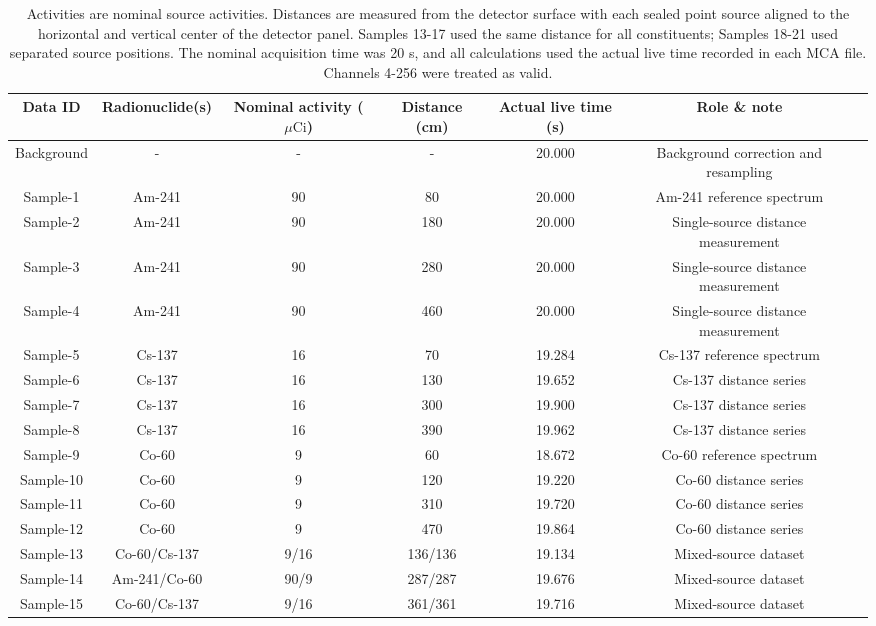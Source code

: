\documentclass[pdflatex,sn-mathphys-num, table]{sn-jnl}%
\theoremstyle{thmstyleone}%
\theoremstyle{thmstyletwo}%
\theoremstyle{thmstylethree}%
\begin{document}
\begin{table}
\centering
\caption{Activities are nominal source activities. Distances are measured from the detector surface with each sealed point source aligned to the horizontal and vertical center of the detector panel. Samples 13-17 used the same distance for all constituents; Samples 18-21 used separated source positions. The nominal acquisition time was 20 s, and all calculations used the actual live time recorded in each MCA file. Channels 4-256 were treated as valid.}
\label{tab:isotope_lists}
\begin{tabular}{ccccccc}
\toprule
Data ID & Radionuclide(s) & Nominal activity  ($\mu\text{Ci}$) & Distance (cm) & Actual live time (s) & Role \& note \\
\midrule
Background  & - &- &- & 20.000 & Background correction and resampling \\
Sample-1    & Am-241 & 90 & 80 & 20.000 & Am-241  reference spectrum \\
Sample-2    & Am-241 & 90 & 180 & 20.000 & Single-source distance measurement \\
Sample-3    & Am-241 & 90 & 280 & 20.000 & Single-source distance measurement \\
Sample-4    & Am-241 & 90 & 460 & 20.000 & Single-source distance measurement \\
Sample-5    & Cs-137 & 16 & 70 & 19.284 & Cs-137 reference spectrum \\
Sample-6    & Cs-137 & 16 & 130 & 19.652 & Cs-137 distance series \\
Sample-7    & Cs-137 & 16 & 300 & 19.900 & Cs-137 distance series \\
Sample-8    & Cs-137 & 16 & 390 & 19.962 & Cs-137 distance series \\
Sample-9    & Co-60 & 9 & 60 & 18.672 & Co-60 reference spectrum \\
Sample-10   & Co-60 & 9 & 120 & 19.220 &  Co-60 distance series\\
Sample-11   & Co-60 & 9 & 310 & 19.720 & Co-60 distance series \\
Sample-12   & Co-60 & 9 & 470 & 19.864 & Co-60 distance series \\
Sample-13   & Co-60/Cs-137 & 9/16 & 136/136 & 19.134 & Mixed-source dataset \\
Sample-14   & Am-241/Co-60 & 90/9 & 287/287 & 19.676 & Mixed-source dataset \\
Sample-15   & Co-60/Cs-137  & 9/16 & 361/361 & 19.716 & Mixed-source dataset \\

\end{tabular}
\end{table}
\end{document}
